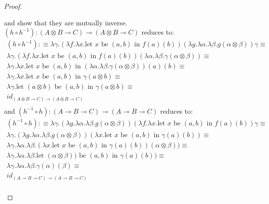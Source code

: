 \documentclass[a4paper,english]{lipics-v2018}
\begin{document}
\begin{theorem}
\begin{proof}
\begin{enumerate}
        and show that they are mutually inverse.\\
        $(h \circ h^{-1}) : (A \otimes B \multimap C) \multimap (A \otimes B \multimap C)$ reduces to:
        \[
          \begin{split}
            (h \circ h^{-1}) : \equiv \lambda \gamma. (\lambda f. \lambda x . \text{let $x$ be $(a, b)$ in $f(a)(b)$})( \lambda g. \lambda \alpha. \lambda \beta. g(\alpha \otimes \beta)) \gamma \equiv\\
            \lambda \gamma. (\lambda f. \lambda x . \text{let $x$ be $(a, b)$ in $f(a)(b)$}) (\lambda \alpha. \lambda \beta. \gamma(\alpha \otimes \beta)) \equiv \\
            \lambda \gamma. \lambda x . \text{let $x$ be $(a, b)$ in $(\lambda \alpha. \lambda \beta. \gamma(\alpha \otimes \beta))(a)(b)$}  \equiv \\
            \lambda \gamma. \lambda x . \text{let $x$ be $(a, b)$ in $\gamma(a \otimes b)$}  \equiv \\
            \lambda \gamma. \text{let $(a \otimes b)$ be $(a, b)$ in $\gamma(a \otimes b)$}  \equiv \\
            id_{(A \otimes B \multimap C) \multimap (A \otimes B \multimap C)}\\
          \end{split}          
        \]
        and $(h^{-1} \circ h) : (A \multimap B \multimap C) \multimap (A \multimap B \multimap C)$ reduces to:
      \[
        \begin{split}
          (h^{-1} \circ h) : \equiv \lambda \gamma. ( \lambda g. \lambda \alpha. \lambda \beta. g(\alpha \otimes \beta))(\lambda f. \lambda x . \text{let $x$ be $(a, b)$ in $f(a)(b)$}) \gamma \equiv\\
          \lambda \gamma. ( \lambda g. \lambda \alpha. \lambda \beta. g(\alpha \otimes \beta))(\lambda x . \text{let $x$ be $(a, b)$ in $\gamma(a)(b)$}) \equiv\\
          \lambda \gamma. \lambda \alpha. \lambda \beta. (\lambda x . \text{let $x$ be $(a, b)$ in $\gamma(a)(b)$})(\alpha \otimes \beta)) \equiv\\
          \lambda \gamma. \lambda \alpha. \lambda \beta. \text{let $(\alpha \otimes \beta))$ be $(a, b)$ in $\gamma(a)(b)$}) \equiv\\
          \lambda \gamma. \lambda \alpha. \lambda \beta. \gamma(\alpha)(\beta) \equiv\\
    id_{(A \multimap B \multimap C) \multimap (A \multimap B \multimap C)}\\

\end{split}\]
\end{enumerate}
\end{proof}
\end{theorem}
\end{document}
